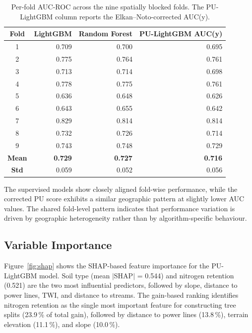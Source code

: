 \documentclass[land,article,submit,moreauthors]{Definitions/mdpi}
\begin{document}
\begin{table}[H]
\centering
\caption{Per-fold AUC-ROC across the nine spatially blocked folds. The PU-LightGBM column reports the Elkan--Noto-corrected AUC(y).}
\label{tab:cv-folds}
\footnotesize
\begin{tabular}{@{} c r r r @{}}
\toprule
\textbf{Fold} & \textbf{LightGBM} & \textbf{Random Forest} & \textbf{PU-LightGBM AUC(y)} \\
\midrule
1 & 0.709 & 0.700 & 0.695 \\
2 & 0.775 & 0.764 & 0.761 \\
3 & 0.713 & 0.714 & 0.698 \\
4 & 0.778 & 0.775 & 0.761 \\
5 & 0.636 & 0.648 & 0.626 \\
6 & 0.643 & 0.655 & 0.642 \\
7 & 0.829 & 0.814 & 0.814 \\
8 & 0.732 & 0.726 & 0.714 \\
9 & 0.743 & 0.748 & 0.729 \\
\midrule
\textbf{Mean} & \textbf{0.729} & \textbf{0.727} & \textbf{0.716} \\
\textbf{Std}  & 0.059 & 0.052 & 0.056 \\
\bottomrule
\end{tabular}
\end{table}

The supervised models show closely aligned fold-wise performance, while the corrected PU score exhibits a similar geographic pattern at slightly lower AUC values. The shared fold-level pattern indicates that performance variation is driven by geographic heterogeneity rather than by algorithm-specific behaviour.

\subsection{Variable Importance}
\label{sec:results-shap}

Figure~\ref{fig:shap} shows the SHAP-based feature importance for the PU-LightGBM model. Soil type (mean $|$SHAP$|$ = 0.544) and nitrogen retention (0.521) are the two most influential predictors, followed by slope, distance to power lines, TWI, and distance to streams. The gain-based ranking identifies nitrogen retention as the single most important feature for constructing tree splits (23.9\,\% of total gain), followed by distance to power lines (13.8\,\%), terrain elevation (11.1\,\%), and slope (10.0\,\%).
\end{document}
